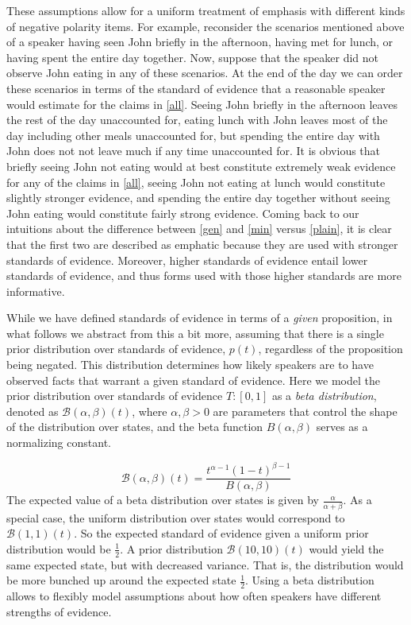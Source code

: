 \documentclass[linguex]{sp}
\theoremstyle{definition} \newtheorem{definition}{Definition}
\begin{document}
These assumptions allow for a uniform treatment of emphasis with different kinds of negative polarity items. For example, reconsider the scenarios mentioned above of a speaker having seen John briefly in the afternoon, having met for lunch, or having spent the entire day together. Now, suppose that the speaker did not observe John eating in any of these scenarios.  At the end of the day we can order these scenarios in terms of the standard of evidence that a reasonable speaker would estimate for the claims in \ref{all}. Seeing John briefly in the afternoon leaves the rest of the day unaccounted for, eating lunch with John leaves most of the day including other meals unaccounted for, but spending the entire day with John does not not leave much if any time unaccounted for. It is obvious that briefly seeing John not eating would at best constitute extremely weak evidence for any of the claims in \ref{all}, seeing John not eating at lunch would constitute slightly stronger evidence, and spending the entire day together without seeing John eating would constitute fairly strong evidence.  Coming back to our intuitions about the difference between \ref{gen} and \ref{min} versus \ref{plain}, it is clear that the first two are described as emphatic because they are used with stronger standards of evidence. Moreover, higher standards of evidence entail lower standards of evidence, and thus forms used with those higher standards are more informative.

While we have defined standards of evidence in terms of a \emph{given} proposition, in what follows we abstract from this a bit more, assuming that there is a single prior distribution over standards of evidence, $p(t)$, regardless of the proposition being negated. This distribution determines how likely speakers are to have observed facts that warrant a given standard of evidence. Here we model the prior distribution over standards of evidence $T : [0, 1]$ as a \emph{beta distribution}, denoted as $\mathcal{B}(\alpha, \beta)(t)$, where $\alpha, \beta > 0$ are parameters that control the shape of the distribution over states, and the beta function $B(\alpha, \beta)$ serves as a normalizing constant.

\begin{equation}
	\mathcal{B}(\alpha, \beta)(t) = \frac{t^{\alpha -1 }(1-t)^{\beta -1 }}{B(\alpha, \beta)}
\end{equation}
The expected value of a beta distribution over states is given by $\frac{\alpha}{\alpha + \beta}$. As a special case, the uniform distribution over states would correspond to $\mathcal{B}(1,1)(t)$. So the expected standard of evidence given a uniform prior distribution would be $\frac{1}{2}$. A prior distribution $\mathcal{B}(10,10)(t)$ would yield the same expected state, but with decreased variance. That is, the distribution would be more bunched up around the expected state $\frac{1}{2}$. Using a beta distribution allows to flexibly model assumptions about how often speakers have different strengths of evidence.
\end{document}
